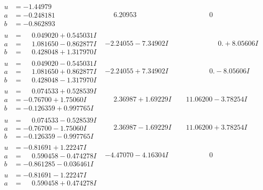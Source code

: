 \documentclass[1p]{elsarticle_modified}
\theoremstyle{definition}
\begin{document}
$$\begin{array}{c|c|c}
\begin{aligned}
u &= -1.44979\phantom{ +0.000000I} \\
a &= -0.248181\phantom{ +0.000000I} \\
b &= -0.862893\phantom{ +0.000000I}\end{aligned}
 & \phantom{-}6.20953\phantom{ +0.000000I} & \phantom{-0.000000 } 0 \\ \hline\begin{aligned}
u &= \phantom{-}0.049020 + 0.545031 I \\
a &= \phantom{-}1.081650 - 0.862877 I \\
b &= \phantom{-}0.428048 + 1.317970 I\end{aligned}
 & -2.24055 - 7.34902 I & \phantom{-0.000000 -}0. + 8.05606 I \\ \hline\begin{aligned}
u &= \phantom{-}0.049020 - 0.545031 I \\
a &= \phantom{-}1.081650 + 0.862877 I \\
b &= \phantom{-}0.428048 - 1.317970 I\end{aligned}
 & -2.24055 + 7.34902 I & \phantom{-0.000000 } 0. - 8.05606 I \\ \hline\begin{aligned}
u &= \phantom{-}0.074533 + 0.528539 I \\
a &= -0.76700 + 1.75060 I \\
b &= -0.126359 + 0.997765 I\end{aligned}
 & \phantom{-}2.36987 + 1.69229 I & \phantom{-}11.06200 - 3.78254 I \\ \hline\begin{aligned}
u &= \phantom{-}0.074533 - 0.528539 I \\
a &= -0.76700 - 1.75060 I \\
b &= -0.126359 - 0.997765 I\end{aligned}
 & \phantom{-}2.36987 - 1.69229 I & \phantom{-}11.06200 + 3.78254 I \\ \hline\begin{aligned}
u &= -0.81691 + 1.22247 I \\
a &= \phantom{-}0.590458 - 0.474278 I \\
b &= -0.861285 - 0.036461 I\end{aligned}
 & -4.47070 - 4.16304 I & \phantom{-0.000000 } 0 \\ \hline\begin{aligned}
u &= -0.81691 - 1.22247 I \\
a &= \phantom{-}0.590458 + 0.474278 I \\

\end{aligned}
\end{array}$$
\end{document}
